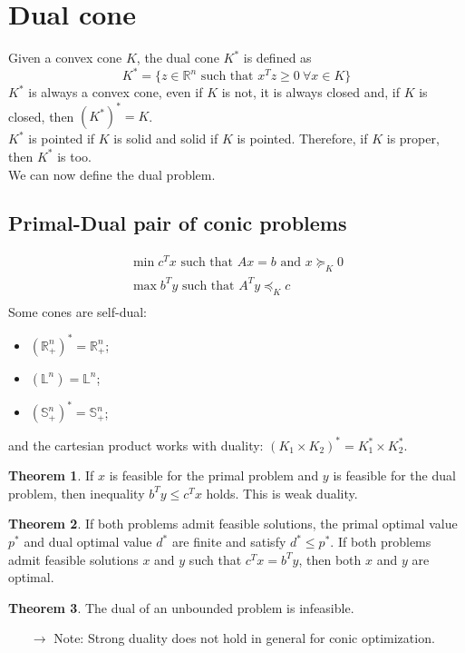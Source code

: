 \documentclass[12pt, openany]{report}
\newcommand{\R}{\mathbb{R}}
\theoremstyle{definition}
\newtheorem{thm}{Theorem}[chapter]
\begin{document}
\section{Dual cone}
Given a convex cone $K$, the dual cone $K^*$ is defined as
\begin{equation}
    K^* = \{z\in \R^n\text{ such that } x^Tz \ge 0 \: \forall x\in K\}
\end{equation}
$K^*$ is always a convex cone, even if $K$ is not, it is always closed and, if $K$ is closed, then $(K^*)^* = K$. \\
$K^*$ is pointed if $K$ is solid and solid if $K$ is pointed. Therefore, if $K$ is proper, then $K^*$ is too. \\
We can now define the dual problem. 
\subsection{Primal-Dual pair of conic problems}
\begin{equation}
    \begin{aligned}
        \min c^Tx \text{ such that } Ax=b\text{ and }x\succeq_K0\\
        \max b^Ty \text{ such that } A^Ty\preceq_K c\\
    \end{aligned}
\end{equation}
Some cones are self-dual:
\begin{itemize}
    \item $(\R_+^n)^* = \R_+^n$;
    \item $(\mathbb{L}^n) = \mathbb{L}^n$;
    \item $(\mathbb{S}_+^n)^* = \mathbb{S}_+^n$;
\end{itemize}
and the cartesian product works with duality: $(K_1\times K_2)^* = K_1^* \times K_2^*$.
\begin{thm}
    If $x$ is feasible for the primal problem and $y$ is feasible for the dual problem, then inequality $b^Ty \le c^Tx$ holds. This is weak duality. 
\end{thm}
\begin{thm}
    If both problems admit feasible solutions, the primal optimal value $p^*$ and dual optimal value $d^*$ are finite and satisfy $d^*\le p^*$. If both problems admit feasible solutions $x$ and $y$ such that $c^Tx=b^Ty$, then both $x$ and $y$ are optimal.
\end{thm}
\begin{thm}
    The dual of an unbounded problem is infeasible.
\end{thm}
\begin{itemize}
    \item [$\rightarrow$] Note: Strong duality does not hold in general for conic optimization.
\end{itemize}
\end{document}
